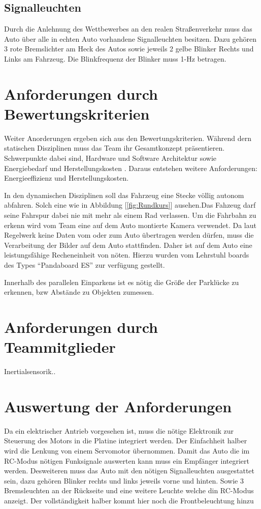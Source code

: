 \subsection{Signalleuchten}
Durch die Anlehnung des Wettbewerbes an den realen Straßenverkehr muss das Auto über alle in echten Auto vorhandene Signalleuchten besitzen. 
Dazu gehören 3 rote Bremslichter am Heck des Autos sowie jeweils 2 gelbe Blinker Rechts und Links am Fahrzeug.  Die Blinkfrequenz der Blinker muss
1-Hz betragen.

\section{Anforderungen durch Bewertungskriterien}
Weiter Anorderungen ergeben sich aus den Bewertungskriterien. Während dern statischen Disziplinen muss das Team ihr Gesamtkonzept präsentieren. Schwerpunkte dabei sind,
Hardware und Software Architektur sowie Energiebedarf und Herstellungskosten \cite{website-carolo-cup-regelwerk}. Daraus entstehen weitere Anforderungen: Energieeffizienz
und Herstellungskosten. 

In den dynamischen Disziplinen soll das Fahrzeug eine Stecke völlig autonom abfahren. Solch eine wie in Abbildung [\ref{fig:Rundkurs}] ausehen.Das Fahzeug darf seine
Fahrspur dabei nie mit mehr als einem Rad verlassen. Um die Fahrbahn zu erkenn wird vom Team eine auf dem Auto montierte Kamera verwendet. Da laut Regelwerk keine
Daten vom oder zum Auto übertragen werden dürfen, muss die Verarbeitung der Bilder auf dem Auto stattfinden. Daher ist auf dem Auto eine leistungsfähige Recheneinheit
von nöten. Hierzu wurden vom Lehrstuhl boards des Types ``Pandaboard ES'' zur verfügung gestellt. 

Innerhalb des parallelen Einparkens ist es nötig die Größe der Parklücke zu erkennen, bzw Abstände zu Objekten zumessen.

\section{Anforderungen durch Teammitglieder}

Inertialsensorik..


\section{Auswertung der Anforderungen}
Da ein elektrischer Antrieb vorgesehen ist, muss die nötige Elektronik zur Steuerung des Motors in die Platine integriert werden.
Der Einfachheit halber wird die Lenkung von einem Servomotor übernommen.
Damit das Auto die im RC-Modus nötigen Funksignale auswerten kann muss ein Empfänger integriert werden.
Desweiteren muss das Auto mit den nötigen Signalleuchten ausgestattet sein, dazu gehören Blinker rechts und links jeweils vorne und hinten.
Sowie 3 Bremsleuchten an der Rückseite und eine weitere Leuchte welche din RC-Modus anzeigt. Der vollständigkeit halber kommt hier noch die
Frontbeleuchtung hinzu

